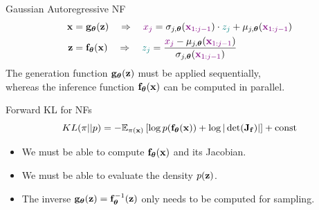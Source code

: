 \documentclass{beamer}
\begin{document}
\begin{frame}{Gaussian Autoregressive NF}
	\vspace{-0.5cm}
	\begin{align*}
		\mathbf{x} &= \mathbf{g}_{\boldsymbol{\theta}}(\mathbf{z}) \quad \Rightarrow \quad {\color{violet} x_j} = \sigma_{j, \boldsymbol{\theta}} ({\color{violet} \mathbf{x}_{1:j-1}}) \cdot {\color{teal} z_j} + \mu_{j, \boldsymbol{\theta}}({\color{violet} \mathbf{x}_{1:j-1}}) \\
		\mathbf{z} &= \mathbf{f}_{\boldsymbol{\theta}}(\mathbf{x}) \quad \Rightarrow \quad {\color{teal} z_j} = \frac{{\color{violet}x_j} - \mu_{j, \boldsymbol{\theta}}({\color{violet}\mathbf{x}_{1:j-1}})}{ \sigma_{j, \boldsymbol{\theta}} ({\color{violet}\mathbf{x}_{1:j-1}})}
	\end{align*}
	The generation function $\mathbf{g}_{\boldsymbol{\theta}}(\mathbf{z})$ must be applied sequentially, \\
	whereas the inference function $\mathbf{f}_{\boldsymbol{\theta}}(\mathbf{x})$ can be computed in parallel.

	\begin{block}{Forward KL for NFs}
		\vspace{-0.2cm}
		\[
			KL(\pi || p)  = -\mathbb{E}_{\pi(\mathbf{x})} \left[\log p(\mathbf{f}_{\boldsymbol{\theta}}(\mathbf{x})) + \log  |\det (\mathbf{J}_{\mathbf{f}})|\right] + \text{const}
		\]
		\vspace{-0.5cm}
		\begin{itemize}
			\item We must be able to compute $\mathbf{f}_{\boldsymbol{\theta}}(\mathbf{x})$ and its Jacobian.
			\item We must be able to evaluate the density $p(\mathbf{z})$.
			\item The inverse $\mathbf{g}_{\boldsymbol{\theta}}(\mathbf{z}) = \mathbf{f}_{\boldsymbol{\theta}}^{-1}(\mathbf{z})$ only needs to be computed for sampling.
		\end{itemize}
	\end{block}
\end{frame}
\end{document}
